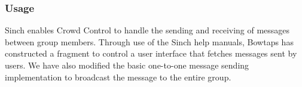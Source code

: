 	\subsubsection{Usage}
	Sinch enables Crowd Control to handle the sending and receiving of messages between group members. Through use of the Sinch help manuals, Bowtaps has constructed a fragment to control a user interface that fetches messages sent by users. We have also modified the basic one-to-one message sending implementation to broadcast the message to the entire group.



